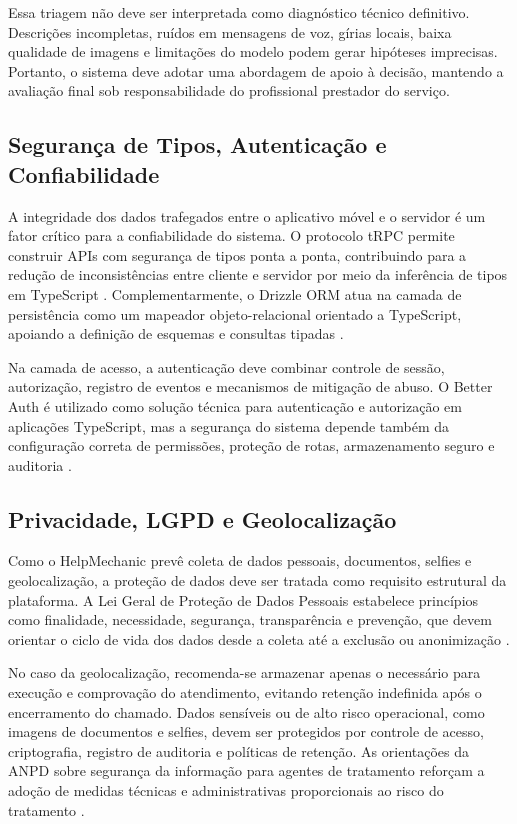 \documentclass[12pt, a4paper]{article}
\begin{document}
Essa triagem não deve ser interpretada como diagnóstico técnico definitivo. Descrições incompletas, ruídos em mensagens de voz, gírias locais, baixa qualidade de imagens e limitações do modelo podem gerar hipóteses imprecisas. Portanto, o sistema deve adotar uma abordagem de apoio à decisão, mantendo a avaliação final sob responsabilidade do profissional prestador do serviço.

\subsection{Segurança de Tipos, Autenticação e Confiabilidade}
A integridade dos dados trafegados entre o aplicativo móvel e o servidor é um fator crítico para a confiabilidade do sistema. O protocolo tRPC permite construir APIs com segurança de tipos ponta a ponta, contribuindo para a redução de inconsistências entre cliente e servidor por meio da inferência de tipos em TypeScript \cite{trpcteam_sd}. Complementarmente, o Drizzle ORM atua na camada de persistência como um mapeador objeto-relacional orientado a TypeScript, apoiando a definição de esquemas e consultas tipadas \cite{drizzle_sd}.

Na camada de acesso, a autenticação deve combinar controle de sessão, autorização, registro de eventos e mecanismos de mitigação de abuso. O Better Auth é utilizado como solução técnica para autenticação e autorização em aplicações TypeScript, mas a segurança do sistema depende também da configuração correta de permissões, proteção de rotas, armazenamento seguro e auditoria \cite{betterauth_sd}.

\subsection{Privacidade, LGPD e Geolocalização}
Como o HelpMechanic prevê coleta de dados pessoais, documentos, selfies e geolocalização, a proteção de dados deve ser tratada como requisito estrutural da plataforma. A Lei Geral de Proteção de Dados Pessoais estabelece princípios como finalidade, necessidade, segurança, transparência e prevenção, que devem orientar o ciclo de vida dos dados desde a coleta até a exclusão ou anonimização \cite{brasil_lgpd2018}.

No caso da geolocalização, recomenda-se armazenar apenas o necessário para execução e comprovação do atendimento, evitando retenção indefinida após o encerramento do chamado. Dados sensíveis ou de alto risco operacional, como imagens de documentos e selfies, devem ser protegidos por controle de acesso, criptografia, registro de auditoria e políticas de retenção. As orientações da ANPD sobre segurança da informação para agentes de tratamento reforçam a adoção de medidas técnicas e administrativas proporcionais ao risco do tratamento \cite{anpd2024}.
\end{document}
